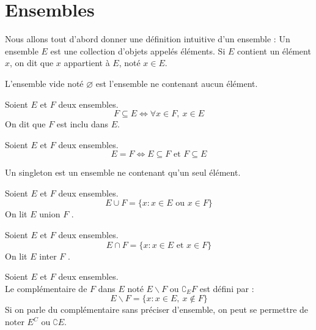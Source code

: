 \chapter{Ensembles}
\def\arraystretch{1}

Nous allons tout d'abord donner une définition intuitive d'un ensemble : Un ensemble $E$ est une collection d'objets appelés éléments. Si $E$ contient un élément $x$, on dit que $x$ appartient à $E$, noté $x \in E$.

\begin{definition}
  L'ensemble vide noté $\varnothing$ est l'ensemble ne contenant aucun élément.
\end{definition}

\begin{definition}[Inclusion]
  Soient $E$ et $F$ deux ensembles.
  $$F \subseteq E \iff \forall x \in F,\ x \in E$$
  On dit que $F$ est inclu dans $E$.
\end{definition}

\begin{definition}
  Soient $E$ et $F$ deux ensembles.
  $$E = F \iff E \subseteq F \text{ et } F \subseteq E$$
\end{definition}

\begin{definition}[Singleton]
  Un singleton est un ensemble ne contenant qu'un seul élément.
\end{definition}

\begin{definition}
  Soient $E$ et $F$ deux ensembles.
  \[ E \cup F = \{ x : x \in E \text{ ou } x \in F \} \]
  On lit \og $E$ union $F$ \fg.
\end{definition}

\begin{definition}
  Soient $E$ et $F$ deux ensembles.
  \[ E \cap F = \{ x : x \in E \text{ et } x \in F \} \]
  On lit \og $E$ inter $F$ \fg.
\end{definition}

\begin{definition}
  Soient $E$ et $F$ deux ensembles. 
  \\
  Le complémentaire de $F$ dans $E$ noté $E \backslash F$ ou $\complement_E F$ est défini par :
  \[ E \backslash F = \{ x : x \in E,\ x \notin F \} \]
  Si on parle du complémentaire sans préciser d'ensemble, on peut se permettre de noter $E^C$ ou $\complement E$.
\end{definition}

